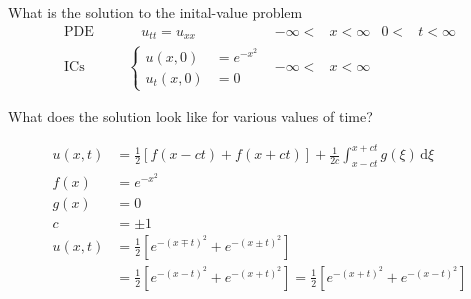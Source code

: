 \documentclass{article}
\begin{document}
What is the solution to the inital-value problem
\begin{align*}
  \text{PDE}&&&\quad u_{tt}=u_{xx}&-\infty<&x<\infty&0<&t<\infty\\
  \text{ICs}&&&\begin{cases}u(x,0)&=e^{-x^2}\\u_t(x,0)&=0\end{cases}&-\infty<&x<\infty
\end{align*}

What does the solution look like for various values of time?

\begin{align*}
  u(x,t)&=\frac{1}{2}\left[f(x-ct)+f(x+ct)\right]+\frac{1}{2c}\int_{x-ct}^{x+ct}{g(\xi)\,\mathrm{d}\xi}\\
  f(x)&=e^{-x^2}\\
  g(x)&=0\\
  c&=\pm1\\
  u(x,t)&=\frac{1}{2}\left[e^{-(x\mp t)^2}+e^{-(x\pm t)^2}\right]\\
  &=\frac{1}{2}\left[e^{-(x-t)^2}+e^{-(x+t)^2}\right]=\frac{1}{2}\left[e^{-(x+t)^2}+e^{-(x-t)^2}\right]
\end{align*}

\end{document}

